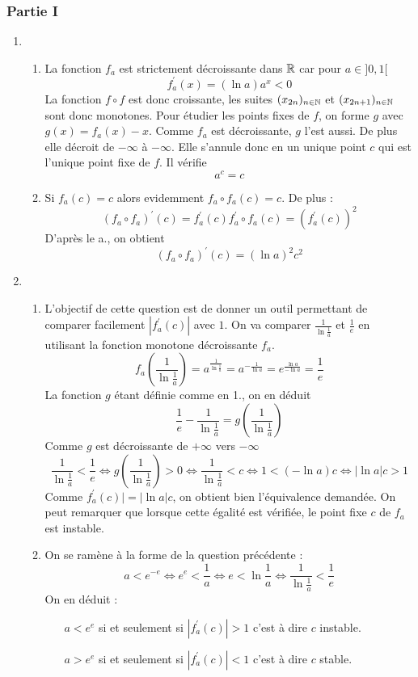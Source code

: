\subsubsection*{Partie I}
\begin{enumerate}
\item \begin{enumerate}
\item La fonction $f_a$ est strictement décroissante dans $\mathbb{R}$ car pour $a\in ]0,1[$
\[f_a^\prime (x) =(\ln a)a^x<0\]
La fonction $f\circ f$ est donc croissante, les suites $(x_{2n})_{n\in\mathbb{N}}$ et $(x_{2n+1})_{n\in\mathbb{N}}$ sont donc monotones.\newline
Pour étudier les points fixes de $f$, on forme $g$ avec $g(x)=f_a(x)-x$. Comme $f_a$ est décroissante, $g$ l'est aussi. De plus elle décroit de $-\infty$ à $-\infty$. Elle s'annule donc en un unique point $c$ qui est l'unique point fixe de $f$. Il vérifie
\[a^c=c\]
\item Si $f_a(c)=c$ alors evidemment $f_a\circ f_a(c)=c$. De plus :
\[(f_a\circ f_a)^\prime(c)=f_a^\prime(c)f_a^\prime\circ f_a(c)=(f_a^\prime(c))^2 \]
D'après le a., on obtient
\[(f_a\circ f_a)^\prime (c)=(\ln a)^2c^2\]
\end{enumerate}
\item \begin{enumerate}
\item L'objectif de cette question est de donner un outil permettant de comparer facilement $|f_a^\prime(c)|$ avec $1$.\newline
On va comparer $\frac{1}{\ln \frac{1}{a}}$ et $\frac{1}{e}$ en utilisant la fonction monotone décroissante $f_a$.
\begin{displaymath}
 f_a(\frac{1}{\ln \frac{1}{a}})=a^{\frac{1}{\ln \frac{1}{a}}}
=a^{-\frac{1}{\ln a}}=e^{\frac{\ln a}{-\ln a}}=\frac{1}{e}
\end{displaymath}
La fonction $g$ étant définie comme en 1., on en déduit
\[
\frac{1}{e} -\frac{1}{\ln \frac{1}{a}}=g(\frac{1}{\ln \frac{1}{a}})
\]
Comme $g$ est décroissante de $+\infty$ vers $-\infty$
\[\frac{1}{\ln \frac{1}{a}}<\frac{1}{e}\Leftrightarrow g(\frac{1}{\ln \frac{1}{a}})>0 \Leftrightarrow \frac{1}{\ln \frac{1}{a}}<c \Leftrightarrow 1<(-\ln a)c \Leftrightarrow |\ln a |c>1\]
Comme $f_a^\prime(c)|=|\ln a |c$, on obtient bien l'équivalence demandée.\newline
On peut remarquer que lorsque cette égalité est vérifiée, le point fixe $c$ de $f_a$ est instable.
\item On se ramène à la forme de la question précédente :
\[
a<e^{-e}\Leftrightarrow e^e < \frac{1}{a} \Leftrightarrow e< \ln \frac{1}{a} 
\Leftrightarrow \frac{1}{\ln \frac{1}{a}}<\frac{1}{e}
\]
On en déduit :
\begin{itemize}
\item[$a<e^e$] si et seulement si $|f_a^\prime(c)|>1$ c'est à dire $c$ instable.
\item[$a>e^e$] si et seulement si $|f_a^\prime(c)|<1$ c'est à dire $c$ stable.
\end{itemize}
\end{enumerate}
\end{enumerate}

